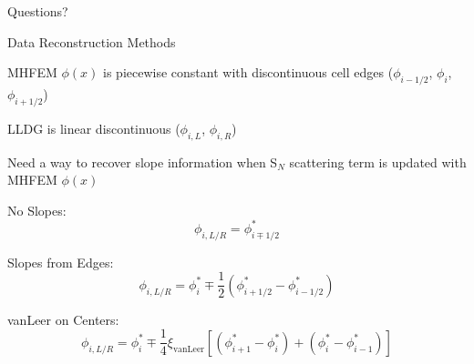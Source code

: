 \documentclass[10pt]{beamer}
\newcommand{\SN}{S$_N$\xspace}
\begin{document}
\begin{frame}[standout]
  Questions?
\end{frame}

\begin{frame}{Data Reconstruction Methods}

	MHFEM $\phi(x)$ is piecewise constant with discontinuous cell edges ($\phi_{i-1/2}$, $\phi_i$, $\phi_{i+1/2}$)

	LLDG is linear discontinuous ($\phi_{i,L}$, $\phi_{i,R}$)

	Need a way to recover slope information when \SN scattering term is updated with MHFEM $\phi(x)$ 

	No Slopes: 
	\begin{equation*}
		\phi_{i,L/R} = \phi_{i\mp1/2}^*
	\end{equation*}

	Slopes from Edges: 
	\begin{equation*}
		\phi_{i,L/R} = \phi_i^* \mp \frac{1}{2} \left(
		\phi_{i+1/2}^* - \phi_{i-1/2}^* \right)
	\end{equation*}

	vanLeer on Centers: 
	\begin{equation*}
		\phi_{i,L/R} = \phi_i^* \mp \frac{1}{4} \xi_\text{vanLeer} \left[ 
			\left(\phi_{i+1}^* - \phi_i^*\right) + \left(\phi_{i}^* - \phi_{i-1}^*\right)
		 \right]
	\end{equation*}

\end{frame}
\end{document}
